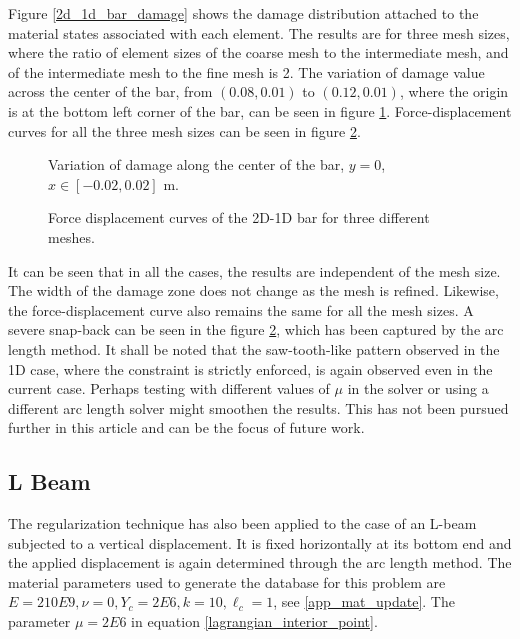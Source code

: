 \documentclass[10pt]{elsarticle}
\begin{document}
Figure \ref{2d_1d_bar_damage} shows the damage distribution attached to the material states associated with each element. The results are for three mesh sizes, where the ratio of element sizes of the coarse mesh to the intermediate mesh, and of the intermediate mesh to the fine mesh is 2. The variation of damage value across the center of the bar, from $(0.08,0.01)$ to $(0.12,0.01)$, where the origin is at the bottom left corner of the bar, can be seen in figure \ref{1D_comparison_x}. Force-displacement curves for all the three mesh sizes can be seen in figure \ref{1D_force_displacement}. 

\begin{figure}[h]
	\centering
	
	\caption{Variation of damage along the center of the bar, $y=0$, $x \in [-0.02,0.02]$ \unit{\meter}.}
	\label{1D_comparison_x}
\end{figure}

\begin{figure}[ht]
	\centering
	
	\caption{Force displacement curves of the 2D-1D bar for three different meshes.}
	\label{1D_force_displacement}
\end{figure}

It can be seen that in all the cases, the results are independent of the mesh size. The width of the damage zone does not change as the mesh is refined. Likewise, the force-displacement curve also remains the same for all the mesh sizes. A severe snap-back can be seen in the figure \ref{1D_force_displacement}, which has been captured by the arc length method. It shall be noted that the saw-tooth-like pattern observed in the 1D case, where the constraint is strictly enforced, is again observed even in the current case. Perhaps testing with different values of $\mu$ in the solver or using a different arc length solver might smoothen the results. This has not been pursued further in this article and can be the focus of future work.


\subsection{L Beam}

The regularization technique has also been applied to the case of an L-beam subjected to a vertical displacement. It is fixed horizontally at its bottom end and the applied displacement is again determined through the arc length method. The material parameters used to generate the database for this problem are $E = 210E9, \nu = 0, Y_c = 2E6, k=10, \ell_c = 1$, see \ref{app_mat_update}. The parameter $\mu = 2E6$ in equation \ref{lagrangian_interior_point}.
\end{document}
